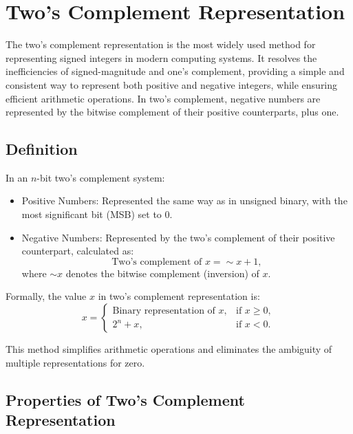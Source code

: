\section{Two's Complement Representation}
The two's complement representation is the most widely used method for representing signed integers in modern computing systems. It resolves the inefficiencies of signed-magnitude and one's complement, providing a simple and consistent way to represent both positive and negative integers, while ensuring efficient arithmetic operations. In two's complement, negative numbers are represented by the bitwise complement of their positive counterparts, plus one.

\subsection{Definition}
In an \( n \)-bit two's complement system:
\begin{itemize}
    \item Positive Numbers: Represented the same way as in unsigned binary, with the most significant bit (MSB) set to \( 0 \).
    \item Negative Numbers: Represented by the two's complement of their positive counterpart, calculated as:
    \[
    \text{Two's complement of } x = \sim x + 1,
    \]
    where \( \sim x \) denotes the bitwise complement (inversion) of \( x \).
\end{itemize}

Formally, the value \( x \) in two's complement representation is:
\[
x =
\begin{cases}
\text{Binary representation of } x, & \text{if } x \geq 0, \\
2^n + x, & \text{if } x < 0.
\end{cases}
\]

This method simplifies arithmetic operations and eliminates the ambiguity of multiple representations for zero.

\subsection{Properties of Two's Complement Representation}

